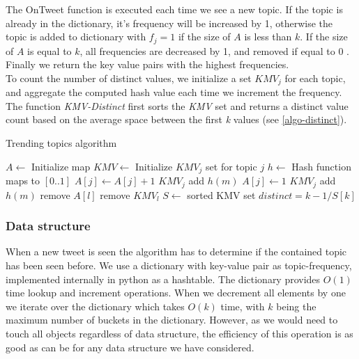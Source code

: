 The OnTweet function is executed each time we see a new topic. If the topic is already in the dictionary, it's frequency will be increased by 1, otherwise the topic is added to dictionary with $f_{j}=1$ if the size of $A$ is less than $k$. If the size of $A$ is equal to $k$, all frequencies are decreased by 1, and removed if equal to 0 \cite{Amit}. Finally we return the key value pairs with the highest frequencies.
\\
To count the number of distinct values, we initialize a set $KMV_{j}$ for each topic, and aggregate the computed hash value each time we increment the frequency. The function \textit{KMV-Distinct} first sorts the \textit{KMV} set and returns a distinct value count based on the average space between the first \textit{k} values (see \ref{algo-distinct}).
\\ 
\begin{algorithm}\scriptsize
\caption{Trending topics algorithm}\label{misra-pseudo}
\begin{algorithmic}[1]
\State $A\gets$ Initialize map
\State $KMV\gets$ Initialize $KMV_{j}$ set for topic $j$
\State $h\gets$ Hash function maps to $[0..1]$
\Statex
{}
    \State $A[j] \leftarrow A[j] + 1$
    \State $KMV_{j}$ add $h(m)$
    \State $A[j] \leftarrow 1$
    \State $KMV_{j}$ add $h(m)$
\Else
        \State remove $A[l]$
        \State remove $KMV_{l}$
        \EndIf
    \EndFor
\EndIf
\EndFunction
\Statex
{}
\State $S\gets$ sorted KMV set
\State $distinct = k-1/S[k]$
\EndFunction
\end{algorithmic}
\end{algorithm}

\subsubsection{Data structure}
When a new tweet is seen the algorithm has to determine if the contained topic has been seen before. We use a dictionary with key-value pair as topic-frequency, implemented internally in python as a hashtable. The dictionary provides $O(1)$ time lookup and increment operations. When we decrement all elements by one we iterate over the dictionary which takes $O(k)$ time, with $k$ being the maximum number of buckets in the dictionary. However, as we would need to touch all objects regardless of data structure, the efficiency of this operation is as good as can be for any data structure we have considered.

